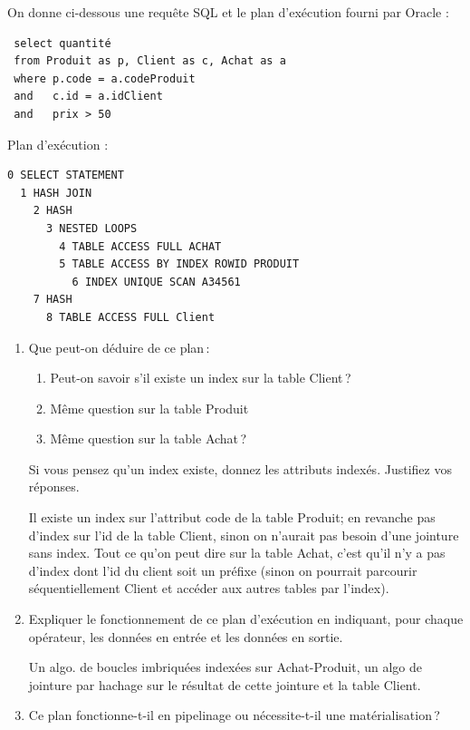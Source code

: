 On donne ci-dessous une requête SQL et le plan d'exécution fourni par Oracle :

\begin{verbatim}
 select quantité
 from Produit as p, Client as c, Achat as a
 where p.code = a.codeProduit
 and   c.id = a.idClient
 and   prix > 50
\end{verbatim}

Plan d'exécution :


\begin{verbatim}
0 SELECT STATEMENT
  1 HASH JOIN
    2 HASH
      3 NESTED LOOPS
        4 TABLE ACCESS FULL ACHAT
        5 TABLE ACCESS BY INDEX ROWID PRODUIT
          6 INDEX UNIQUE SCAN A34561
    7 HASH
      8 TABLE ACCESS FULL Client
\end{verbatim}

\begin{enumerate}
 \item Que peut-on déduire de ce plan\,: 
  \begin{enumerate}
     \item Peut-on savoir s'il
    existe un index sur la table Client\,? 
    \item Même question sur la table Produit
   \item Même question sur la table Achat\,? 
 \end{enumerate}
 Si vous pensez
   qu'un index existe, donnez les attributs indexés. 
     Justifiez vos réponses.
\begin{solution}
Il existe un index sur l'attribut code de la table Produit;
en revanche pas d'index sur l'id de la table Client, sinon
on n'aurait  pas besoin d'une jointure sans index. Tout ce qu'on peut
dire sur la table Achat, c'est qu'il n'y a pas d'index dont
l'id du client soit un préfixe (sinon on pourrait parcourir séquentiellement
Client et accéder aux autres tables par l'index).
\end{solution}

  \item  Expliquer le fonctionnement de ce plan d'exécution en indiquant,
      pour chaque opérateur, les données en entrée et les données
      en sortie. 

\begin{solution}
Un algo. de boucles imbriquées indexées sur Achat-Produit, un
algo de jointure par hachage sur le résultat de cette jointure et la
table Client.
\end{solution}

  \item  Ce plan fonctionne-t-il en pipelinage ou nécessite-t-il
       une matérialisation\,?


\end{enumerate}
